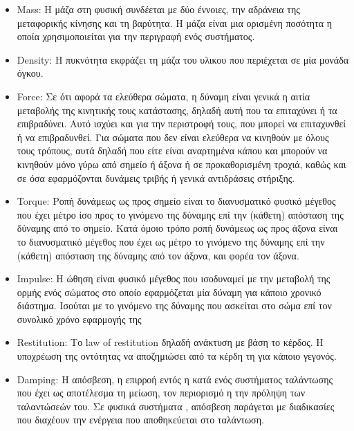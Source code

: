 \begin{itemize}
\item Mass: Η μάζα στη φυσική συνδέεται με δύο έννοιες, την αδράνεια της μεταφορικής κίνησης και τη βαρύτητα. Η μάζα είναι μια ορισμένη ποσότητα η οποία χρησιμοποιείται για την περιγραφή ενός συστήματος.

\item Density:  Η πυκνότητα εκφράζει τη μάζα του υλικου που περιέχεται σε μία μονάδα όγκου. 

\item Force: Σε ότι αφορά τα ελεύθερα σώματα, η δύναμη είναι γενικά η αιτία μεταβολής της κινητικής τους κατάστασης, δηλαδή αυτή που τα επιταχύνει ή τα επιβραδύνει. Αυτό ισχύει και για την περιστροφή τους, που μπορεί να επιταχυνθεί ή να επιβραδυνθεί. Για σώματα που δεν είναι ελεύθερα να κινηθούν με όλους τους τρόπους, αυτά δηλαδή που είτε είναι αναρτημένα κάπου και μπορούν να κινηθούν μόνο γύρω από σημείο ή άξονα ή σε προκαθορισμένη τροχιά, καθώς και σε όσα εφαρμόζονται δυνάμεις τριβής ή γενικά αντιδράσεις στήριξης.

\item Torque: Ροπή δυνάμεως ως προς σημείο είναι το διανυσματικό φυσικό μέγεθος που έχει μέτρο ίσο προς το γινόμενο της δύναμης επί την (κάθετη) απόσταση της δύναμης από το σημείο. Κατά όμοιο τρόπο ροπή δυνάμεως ως προς άξονα είναι το διανυσματικό μέγεθος που έχει ως μέτρο το γινόμενο της δύναμης επί την (κάθετη) απόσταση της δύναμης από τον άξονα, και φορέα τον άξονα.

\item Impulse: Η ώθηση είναι φυσικό μέγεθος που ισοδυναμεί με την μεταβολή της ορμής ενός σώματος στο οποίο εφαρμόζεται μία δύναμη για κάποιο χρονικό διάστημα. Ισούται με το γινόμενο της δύναμης που ασκείται στο σώμα επί τον συνολικό χρόνο εφαρμογής της

\item Restitution: Το law of restitution δηλαδή ανάκτυση με βάση το κέρδος. Η υποχρέωση της οντότητας να αποζημιώσει από τα κέρδη τη για κάποιο γεγονός. 

\item Damping: Η απόσβεση, η επιρροή εντός η κατά ενός συστήματος ταλάντωσης που έχει ως αποτέλεσμα τη μείωση, τον περιορισμό η την πρόληψη των ταλαντώσεών του. Σε φυσικά συστήματα , απόσβεση παράγεται με διαδικασίες που διαχέουν την ενέργεια που αποθηκεύεται στο ταλάντωση.
\end{itemize}

